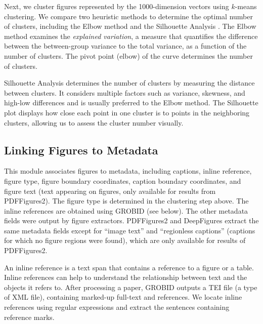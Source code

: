 \documentclass{article}
\begin{document}
Next, we cluster figures represented by the 1000-dimension vectors using $k$-means clustering. We compare two heuristic methods to determine the optimal number of clusters, including the Elbow method %
and the Silhouette Analysis \citep{rousseeue1987silhouettes}. The Elbow method examines the \emph{explained variation}, a measure that quantifies the difference between the between-group variance to the total variance,  as a function of the number of clusters. The pivot point (elbow) of the curve determines the number of clusters. 

Silhouette Analysis determines the number of clusters by measuring the distance between clusters. 
It considers multiple factors such as variance, skewness, and high-low differences and is usually preferred to the Elbow method. The Silhouette plot displays how close each point in one cluster is to points in the neighboring clusters, allowing us to assess the cluster number visually.  %
 

\subsection{Linking Figures to Metadata}
This module associates figures to metadata, including captions, inline reference, figure type, figure boundary coordinates, caption boundary coordinates, and figure text (text appearing on figures, only available for results from {\sc PDFFigures2}). The figure type is determined in the clustering step above. The inline references are obtained using GROBID (see below). The other metadata fields were output by figure extractors. {\sc PDFFigures2} and {\sc DeepFigures} extract the same metadata fields except for ``image text'' and ``regionless captions'' (captions for which no figure regions were found), which are only available for results of {\sc PDFFigures2}.


An inline reference is a text span that contains a reference to a figure or a table. Inline references can help to understand the relationship between text and the objects it refers to. After processing a paper, GROBID outputs a TEI file (a type of XML file), containing marked-up full-text and references. We locate inline references using regular expressions and extract the sentences containing reference marks. 
\end{document}
